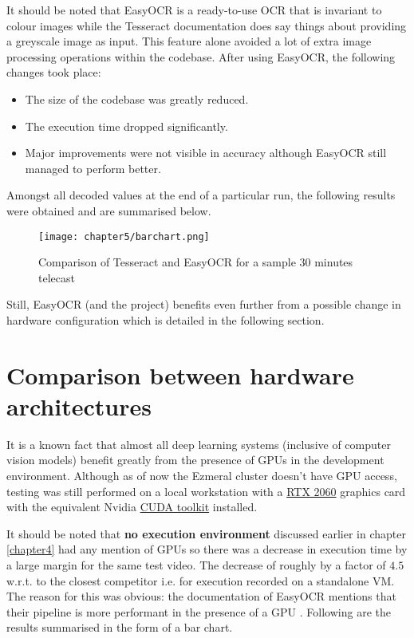 It should be noted that EasyOCR is a ready-to-use OCR that is invariant to colour images while the Tesseract documentation does say things about providing a greyscale image as input. This feature alone avoided a lot of extra image processing operations within the codebase. After using EasyOCR, the following changes took place:

\begin{itemize}
 \item The size of the codebase was greatly reduced.
 \item The execution time dropped significantly.
 \item Major improvements were not visible in accuracy although EasyOCR still managed to perform better.
\end{itemize}

Amongst all decoded values at the end of a particular run, the following results were obtained and are summarised below.

\begin{figure}[h]
  \centering
  \texttt{[image: chapter5/barchart.png]}
  \caption{Comparison of Tesseract and EasyOCR for a sample $30$ minutes telecast}
  \label{fig:easy_vs_tess}
\end{figure}

Still, EasyOCR (and the project) benefits even further from a possible change in hardware configuration which is detailed in the following section.


\section{Comparison between hardware architectures}

It is a known fact that almost all deep learning systems (inclusive of computer vision models) benefit greatly from the presence of GPUs in the development environment. Although as of now the Ezmeral cluster doesn’t have GPU access, testing was still performed on a local workstation with a \href{ https://www.nvidia.com/en-in/geforce/20-series/}{RTX 2060} graphics card with the equivalent Nvidia \href{https://developer.nvidia.com/cuda-toolkit}{CUDA toolkit} installed. \par

It should be noted that \textbf{no execution environment} discussed earlier in chapter \ref{chapter4} had any mention of GPUs so there was a decrease in execution time by a large margin for the same test video. The decrease of roughly by a factor of $4.5$ w.r.t. to the closest competitor i.e. for execution recorded on a standalone VM. The reason for this was obvious: the documentation of EasyOCR mentions that their pipeline is more performant in the presence of a GPU \cite{Jaided}. Following are the results summarised in the form of a bar chart.

